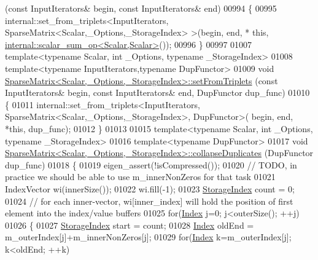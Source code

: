 \begin{DoxyCode}
      (\textcolor{keyword}{const} InputIterators& begin, \textcolor{keyword}{const} InputIterators& end)
00994 \{
00995   internal::set\_from\_triplets<InputIterators, SparseMatrix<Scalar,\_Options,\_StorageIndex> >(begin, end, *\textcolor{keyword}{
      this}, \hyperlink{struct_eigen_1_1internal_1_1scalar__sum__op}{internal::scalar\_sum\_op<Scalar,Scalar>}());
00996 \}
00997 
01007 \textcolor{keyword}{template}<\textcolor{keyword}{typename} Scalar, \textcolor{keywordtype}{int} \_Options, \textcolor{keyword}{typename} \_StorageIndex>
01008 \textcolor{keyword}{template}<\textcolor{keyword}{typename} InputIterators,\textcolor{keyword}{typename} DupFunctor>
01009 \textcolor{keywordtype}{void} \hyperlink{group___sparse_core___module_acc35051d698e3973f1de5b9b78dbe345}{SparseMatrix<Scalar,\_Options,\_StorageIndex>::setFromTriplets}
      (\textcolor{keyword}{const} InputIterators& begin, \textcolor{keyword}{const} InputIterators& end, DupFunctor dup\_func)
01010 \{
01011   internal::set\_from\_triplets<InputIterators, SparseMatrix<Scalar,\_Options,\_StorageIndex>, DupFunctor>(
      begin, end, *\textcolor{keyword}{this}, dup\_func);
01012 \}
01013 
01015 \textcolor{keyword}{template}<\textcolor{keyword}{typename} Scalar, \textcolor{keywordtype}{int} \_Options, \textcolor{keyword}{typename} \_StorageIndex>
01016 \textcolor{keyword}{template}<\textcolor{keyword}{typename} DupFunctor>
01017 \textcolor{keywordtype}{void} \hyperlink{group___sparse_core___module_class_eigen_1_1_sparse_matrix}{SparseMatrix<Scalar,\_Options,\_StorageIndex>::collapseDuplicates}
      (DupFunctor dup\_func)
01018 \{
01019   eigen\_assert(!isCompressed());
01020   \textcolor{comment}{// TODO, in practice we should be able to use m\_innerNonZeros for that task}
01021   IndexVector wi(innerSize());
01022   wi.fill(-1);
01023   \hyperlink{group___sparse_core___module_a0b540ba724726ebe953f8c0df06081ed}{StorageIndex} count = 0;
01024   \textcolor{comment}{// for each inner-vector, wi[inner\_index] will hold the position of first element into the index/value
       buffers}
01025   \textcolor{keywordflow}{for}(\hyperlink{group___core___module_a554f30542cc2316add4b1ea0a492ff02}{Index} j=0; j<outerSize(); ++j)
01026   \{
01027     \hyperlink{group___sparse_core___module_a0b540ba724726ebe953f8c0df06081ed}{StorageIndex} start   = count;
01028     \hyperlink{group___core___module_a554f30542cc2316add4b1ea0a492ff02}{Index} oldEnd  = m\_outerIndex[j]+m\_innerNonZeros[j];
01029     \textcolor{keywordflow}{for}(\hyperlink{group___core___module_a554f30542cc2316add4b1ea0a492ff02}{Index} k=m\_outerIndex[j]; k<oldEnd; ++k)

\end{DoxyCode}
